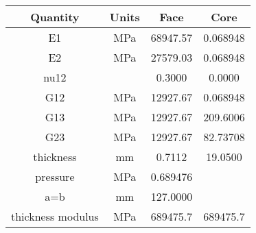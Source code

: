 \begin{table}
\centering
\begin{tabular}{||c||c||c||c||}
\hline \hline
Quantity & Units & Face & Core \\ 
\hline
\hline
E1 & MPa & 68947.57 & 0.068948 \\ 
\hline
E2 & MPa & 27579.03 & 0.068948 \\ 
\hline
nu12 &  & 0.3000 & 0.0000 \\ 
\hline
G12 & MPa & 12927.67 & 0.068948 \\ 
\hline
G13 & MPa & 12927.67 & 209.6006 \\ 
\hline
G23 & MPa & 12927.67 & 82.73708 \\ 
\hline
thickness & mm & 0.7112 & 19.0500 \\ 
\hline
pressure & MPa & 0.689476 &  \\ 
\hline
a=b & mm & 127.0000 &  \\ 
\hline
thickness modulus & MPa & 689475.7 & 689475.7 \\ 
\hline
\hline
\end{tabular}
\caption{}
\label{tab:}%
\end{table}
